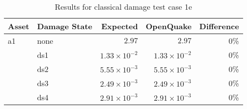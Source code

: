 \begin{table}[htbp]

\centering
\begin{tabular}{ l l r r r }

\hline
\rowcolor{anti-flashwhite}
\bf{Asset} & \bf{Damage State} & \bf{Expected} & \bf{OpenQuake} & \bf{Difference}\\
\hline
a1 & none & $2.97$ & $2.97$ & 0\% \\
   & ds1 & $1.33 \times 10^{-2}$ & $1.33 \times 10^{-2}$ & 0\% \\
   & ds2 & $5.55 \times 10^{-3}$ & $5.55 \times 10^{-3}$ & 0\% \\
   & ds3 & $2.49 \times 10^{-3}$ & $2.49 \times 10^{-3}$ & 0\% \\
   & ds4 & $2.91 \times 10^{-3}$ & $2.91 \times 10^{-3}$ & 0\% \\
\hline
\end{tabular}

\caption{Results for classical damage test case 1e}
\label{tab:result-cd-1e}
\end{table}